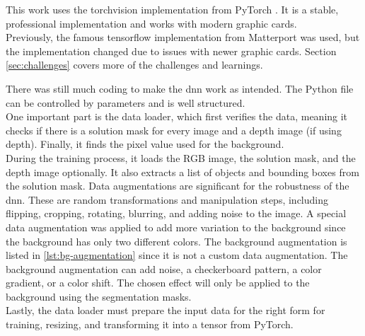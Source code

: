 		This work uses the torchvision implementation from PyTorch \cite{Torchvision}. It is a stable, professional implementation and works with modern graphic cards.\\
		Previously, the famous tensorflow implementation from Matterport \cite{Matterport} was used, but the implementation changed due to issues with newer graphic cards. Section \ref{sec:challenges} covers more of the challenges and learnings.
		
		\clearpage
		There was still much coding to make the \ac{dnn} work as intended. The Python file can be controlled by parameters and is well structured.\\
		One important part is the data loader, which first verifies the data, meaning it checks if there is a solution mask for every image and a depth image (if using depth). Finally, it finds the pixel value used for the background.\\
		During the training process, it loads the RGB image, the solution mask, and the depth image optionally. It also extracts a list of objects and bounding boxes from the solution mask. Data augmentations are significant for the robustness of the \ac{dnn}. These are random transformations and manipulation steps, including flipping, cropping, rotating, blurring, and adding noise to the image. A special data augmentation was applied to add more variation to the background since the background has only two different colors. The background augmentation is listed in \ref{lst:bg-augmentation} since it is not a custom data augmentation. The background augmentation can add noise, a checkerboard pattern, a color gradient, or a color shift. The chosen effect will only be applied to the background using the segmentation masks. \\
		Lastly, the data loader must prepare the input data for the right form for training, resizing, and transforming it into a tensor from PyTorch.
		
